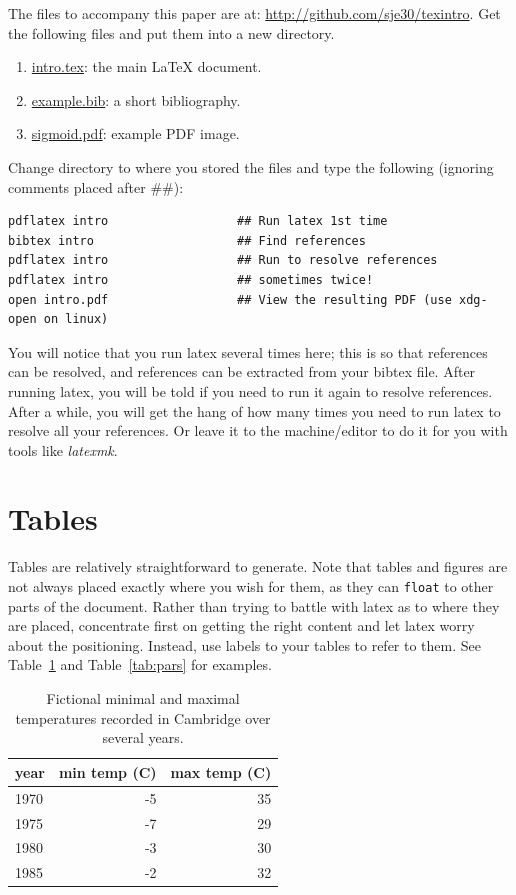 \documentclass[]{article}
\providecommand*{\latex}{\LaTeX\xspace}
\begin{document}
The files to accompany this paper are at:
\url{http://github.com/sje30/texintro}.  Get the
following files and put them into a new directory.

\begin{enumerate}
\item \url{intro.tex}: the main \latex document.
\item \url{example.bib}: a short bibliography.
\item \url{sigmoid.pdf}: example PDF image.
\end{enumerate}

Change directory to where you stored the files and type the
following (ignoring comments placed after \#\#):

\begin{verbatim}
pdflatex intro                  ## Run latex 1st time
bibtex intro                    ## Find references
pdflatex intro                  ## Run to resolve references
pdflatex intro                  ## sometimes twice!
open intro.pdf                  ## View the resulting PDF (use xdg-open on linux)
\end{verbatim}

You will notice that you run latex several times here; this is so that
references can be resolved, and references can be extracted from your
bibtex file.  After running latex, you will be told if you need to run
it again to resolve references.  After a while, you will get the hang
of how many times you need to run latex to resolve all your
references.  Or leave it to the machine/editor to do it for you with
tools like \textit{latexmk}.

\section{Tables}

Tables are relatively straightforward to generate.  Note that tables
and figures are not always placed exactly where you wish for them, as
they can \texttt{float} to other parts of the document.  Rather than
trying to battle with latex as to where they are placed, concentrate
first on getting the right content and let latex worry about the
positioning.  Instead, use labels to your tables to refer to them.
See Table~\ref{tab:simple} and Table~\ref{tab:pars} for examples.


\begin{table}
  \centering
  \begin{tabular}{|l|rr|}
    \hline
    year & min temp (C) & max temp (C)\\ \hline
    1970 & -5 & 35\\
    1975 & -7 & 29\\
    1980 & -3 & 30\\
    1985 & -2 & 32\\ \hline
  \end{tabular}
  \caption{Fictional minimal and maximal temperatures recorded in
    Cambridge over several years.}
  \label{tab:simple}
\end{table}
\end{document}
